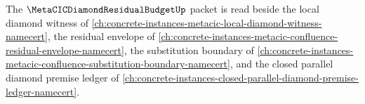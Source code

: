 The $\MetaCICDiamondResidualBudgetUp$ packet is read beside the local diamond witness of \autoref{ch:concrete-instances-metacic-local-diamond-witness-namecert}, the residual envelope of \autoref{ch:concrete-instances-metacic-confluence-residual-envelope-namecert}, the substitution boundary of \autoref{ch:concrete-instances-metacic-confluence-substitution-boundary-namecert}, and the closed parallel diamond premise ledger of \autoref{ch:concrete-instances-closed-parallel-diamond-premise-ledger-namecert}.



